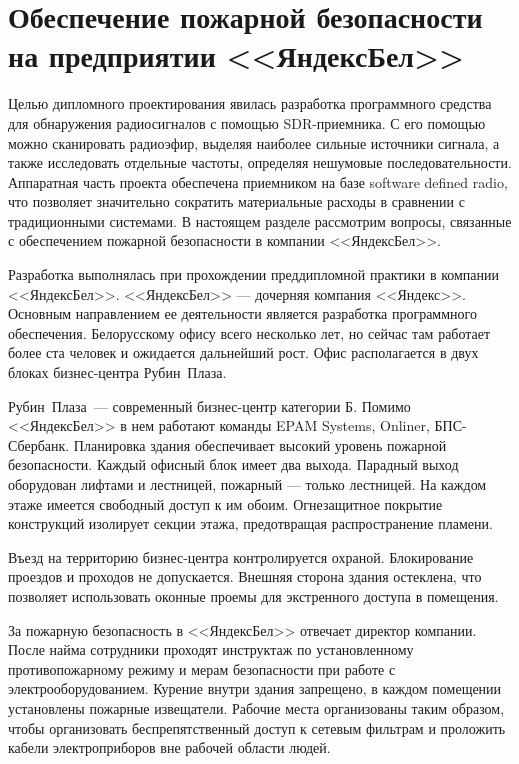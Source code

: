 \newcommand{\yandex}{\mbox{<<Яндекс>>}}
\newcommand{\yandexbel}{\mbox{<<ЯндексБел>>}}
\newcommand{\rubinplaza}{\mbox{Рубин Плаза}}

\section[Обеспечение пожарной безопасности на предприятии]{Обеспечение пожарной безопасности на предприятии \yandexbel{}}

Целью дипломного проектирования явилась разработка программного средства для обнаружения радиосигналов с помощью SDR-приемника. С его помощью можно сканировать радиоэфир, выделяя наиболее сильные источники сигнала, а также исследовать отдельные частоты, определяя нешумовые последовательности. Аппаратная часть проекта обеспечена приемником на базе software defined radio, что позволяет значительно сократить материальные расходы в сравнении с традиционными системами. В настоящем разделе рассмотрим вопросы, связанные с обеспечением пожарной безопасности в компании \yandexbel{}. \cite{bsuir_ot_diploma_man}

Разработка выполнялась при прохождении преддипломной практики в компании \yandexbel{}. \yandexbel{} --- дочерняя компания \yandex{}. Основным направлением ее деятельности является разработка программного обеспечения. Белорусскому офису всего несколько лет, но сейчас там работает более ста человек и ожидается дальнейший рост. Офис располагается в двух блоках бизнес-центра \rubinplaza{}.

\rubinplaza~--- современный бизнес-центр категории Б. Помимо \yandexbel{} в нем работают команды EPAM Systems, Onliner, БПС-Сбербанк. Планировка здания обеспечивает высокий уровень пожарной безопасности. Каждый офисный блок имеет два выхода. Парадный выход оборудован лифтами и лестницей, пожарный --- только лестницей. На каждом этаже имеется свободный доступ к им обоим. Огнезащитное покрытие конструкций изолирует секции этажа, предотвращая распространение пламени.

Въезд на территорию бизнес-центра контролируется охраной. Блокирование проездов и проходов не допускается. Внешняя сторона здания остеклена, что позволяет использовать оконные проемы для экстренного доступа в помещения.

За пожарную безопасность в \yandexbel{} отвечает директор компании. После найма сотрудники проходят инструктаж по установленному противопожарному режиму и мерам безопасности при работе с электрооборудованием. Курение внутри здания запрещено, в каждом помещении установлены пожарные извещатели. Рабочие места организованы таким образом, чтобы организовать беспрепятственный доступ к сетевым фильтрам и проложить кабели электроприборов вне рабочей области людей.

